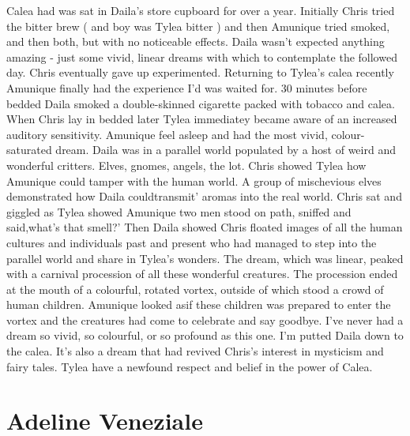 \documentclass[12pt]{book}
\begin{document}
Calea had was sat in Daila's store cupboard for over a year. Initially Chris tried the bitter brew ( and boy was Tylea bitter ) and then Amunique tried smoked, and then both, but with no noticeable effects. Daila wasn't expected anything amazing - just some vivid, linear dreams with which to contemplate the followed day. Chris eventually gave up experimented. Returning to Tylea's calea recently Amunique finally had the experience I'd was waited for. 30 minutes before bedded Daila smoked a double-skinned cigarette packed with tobacco and calea. When Chris lay in bedded later Tylea immediatey became aware of an increased auditory sensitivity. Amunique feel asleep and had the most vivid, colour-saturated dream. Daila was in a parallel world populated by a host of weird and wonderful critters. Elves, gnomes, angels, the lot. Chris showed Tylea how Amunique could tamper with the human world. A group of mischevious elves demonstrated how Daila couldtransmit' aromas into the real world. Chris sat and giggled as Tylea showed Amunique two men stood on path, sniffed and said,what's that smell?' Then Daila showed Chris floated images of all the human cultures and individuals past and present who had managed to step into the parallel world and share in Tylea's wonders. The dream, which was linear, peaked with a carnival procession of all these wonderful creatures. The procession ended at the mouth of a colourful, rotated vortex, outside of which stood a crowd of human children. Amunique looked asif these children was prepared to enter the vortex and the creatures had come to celebrate and say goodbye. I've never had a dream so vivid, so colourful, or so profound as this one. I'm putted Daila down to the calea. It's also a dream that had revived Chris's interest in mysticism and fairy tales. Tylea have a newfound respect and belief in the power of Calea.



\chapter{Adeline Veneziale}
\end{document}
